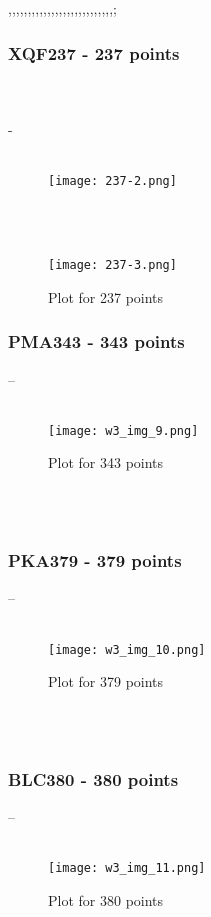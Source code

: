 ,,,,,,,,,,,,,,,,,,,,,,,,,,,;\documentclass[conference]{IEEEtran}
\begin{document}
\subsubsection{XQF237 - 237 points}
\\
\\
-
\\
\\
\begin{figure}[htbp]
\centerline{\texttt{[image: 237-2.png]}}
\label{fig}
\end{figure}
\\
\\
\begin{figure}[htbp]
\centerline{\texttt{[image: 237-3.png]}}
\caption{Plot for 237 points}
\label{fig}
\end{figure}

\subsubsection{PMA343 - 343 points}

--
\\
\\
\begin{figure}[htbp]
\centerline{\texttt{[image: w3\_img\_9.png]}}
\caption{Plot for 343 points}
\label{fig}
\end{figure}
\\
\\
\subsubsection{PKA379 - 379 points}
--
\\
\\
\begin{figure}[htbp]
\centerline{\texttt{[image: w3\_img\_10.png]}}
\caption{Plot for 379 points}
\label{fig}
\end{figure}
\\
\\
\subsubsection{BLC380 - 380 points}
--
\\
\\
\begin{figure}[htbp]
\centerline{\texttt{[image: w3\_img\_11.png]}}
\caption{Plot for 380 points}
\label{fig}
\end{figure}
\end{document}
